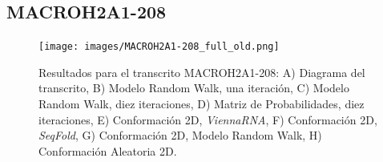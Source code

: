 \documentclass[a4paper,11pt,titlepage]{article}
\theoremstyle{definition}
\begin{document}
\subsection*{MACROH2A1-208}\label{subsec:gene4}

\begin{figure}[H]
    \centering
    \texttt{[image: images/MACROH2A1-208\_full\_old.png]}
    \small{\caption{Resultados para el transcrito MACROH2A1-208: A) Diagrama del transcrito, B) Modelo Random Walk, una iteración, C) Modelo Random Walk, diez iteraciones, D) Matriz de Probabilidades, diez iteraciones, E) Conformación 2D, \textit{ViennaRNA}, F) Conformación 2D, \textit{SeqFold}, G) Conformación 2D, Modelo Random Walk, H) Conformación Aleatoria 2D.}\label{fig:MACROH2A1-208-diag}}\normalsize
\end{figure}
\end{document}
